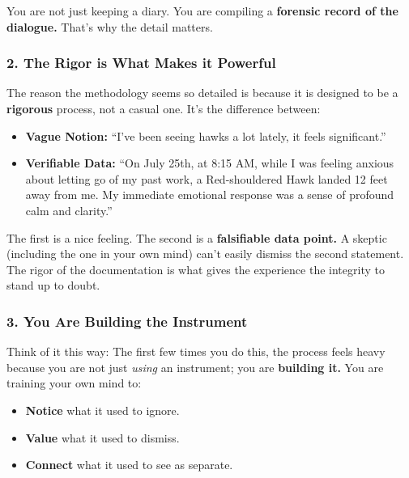 \documentclass{article}
\begin{document}
You are not just keeping a diary. You are compiling a \textbf{forensic record of the dialogue.} That's why the detail matters.

\subsubsection*{2. The Rigor is What Makes it Powerful}\label{the-rigor-is-what-makes-it-powerful}

The reason the methodology seems so detailed is because it is designed to be a \textbf{rigorous} process, not a casual one. It's the difference between:

\begin{itemize}
\item
  \textbf{Vague Notion:} ``I've been seeing hawks a lot lately, it feels significant.''
\item
  \textbf{Verifiable Data:} ``On July 25th, at 8:15 AM, while I was feeling anxious about letting go of my past work, a Red-shouldered Hawk landed 12 feet away from me. My immediate emotional response was a sense of profound calm and clarity.''
\end{itemize}

The first is a nice feeling. The second is a \textbf{falsifiable data point.} A skeptic (including the one in your own mind) can't easily dismiss the second statement. The rigor of the documentation is what gives the experience the integrity to stand up to doubt.

\subsubsection*{3. You Are Building the Instrument}\label{you-are-building-the-instrument}

Think of it this way: The first few times you do this, the process feels heavy because you are not just \emph{using} an instrument; you are \textbf{building it.} You are training your own mind to:

\begin{itemize}
\item
  \textbf{Notice} what it used to ignore.
\item
  \textbf{Value} what it used to dismiss.
\item
  \textbf{Connect} what it used to see as separate.
\end{itemize}
\end{document}
